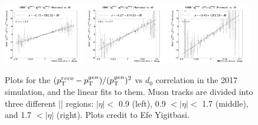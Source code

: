 \begin{figure}[!htb]
      \centering
      \includegraphics[width=0.32\textwidth]{pics/muon_corr/GeoFit/fit_results/2017_DY_eta_0_0p9_dRelPt2p0_Roch.png}
      \includegraphics[width=0.32\textwidth]{pics/muon_corr/GeoFit/fit_results/2017_DY_eta_0p9_1p7_dRelPt2p0_Roch.png}
      \includegraphics[width=0.32\textwidth]{pics/muon_corr/GeoFit/fit_results/2017_DY_eta_1p7_inf_dRelPt2p0_Roch.png}
      \caption{Plots for the $(p_{\mathrm{T}}^{reco}-p_{\mathrm{T}}^{gen})/ (p_{\mathrm{T}}^{gen})^{2}$ vs $d_0$ correlation in the 2017 \DY simulation, 
               and the linear fits to them. Muon tracks are divided into three different |\eta| regions:
               $|\eta| <$ 0.9 (left), 0.9 $< |\eta| <$ 1.7 (middle), and 1.7 $< |\eta|$ (right).
               Plots credit to Efe Yigitbasi.}
      \label{fig:geofit_param_2017}
\end{figure}

